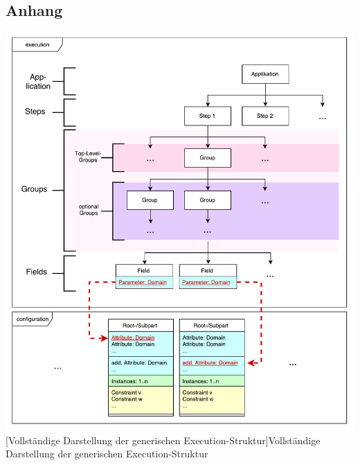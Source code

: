 
\renewcommand\refname{Anhang}
\begin{appendix}
\chapter{Anhang}

\vspace{1em}
\begin{minipage}{\linewidth}
	\centering
	\includegraphics[width=1\linewidth]{Abbildungen/tactonModellExecution.pdf}
	[Vollständige Darstellung der generischen Execution-Struktur]{Vollständige Darstellung der generischen Execution-Struktur}
	\label{app:tactonModellExecutionLong}
\end{minipage}
\vspace{1em}


\end{appendix}
